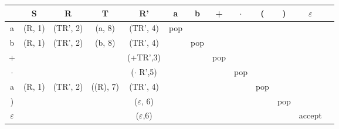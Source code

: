 
\begin{table}[H]
    \centering
    \begin{tabular}{|c|c|c|c|c|c|c|c|c|c|c|c|c|}
         \hline & S & R & T & R' & a & b & + & $\cdot$ & ( & ) & $\varepsilon$\\
         \hline a & (R, 1)  & (TR', 2)  & (a, 8) & (TR', 4)  & pop &  &  &  & & &\\
         \hline b & (R, 1)  & (TR', 2)  & (b, 8) & (TR', 4)  &  & pop &  &  & & &\\
        \hline + &  &  &  & (+TR',3) &  &  & pop &  & & &\\
        \hline $\cdot$ &  &  &  & ($\cdot$ R',5) &  &  &  & pop & & &\\
         \hline a & (R, 1)  & (TR', 2)  & ((R), 7) & (TR', 4)  &  &  &  &  & pop & &\\
        \hline ) &  &  &  & ($\varepsilon$, 6) &  &  &  &  & & pop &\\
        \hline $\varepsilon$ &  &  &  & ($\varepsilon$,6) &  &  &  &  & & & accept \\
        \hline
    \end{tabular}
    \label{tab:my_label}
\end{table}